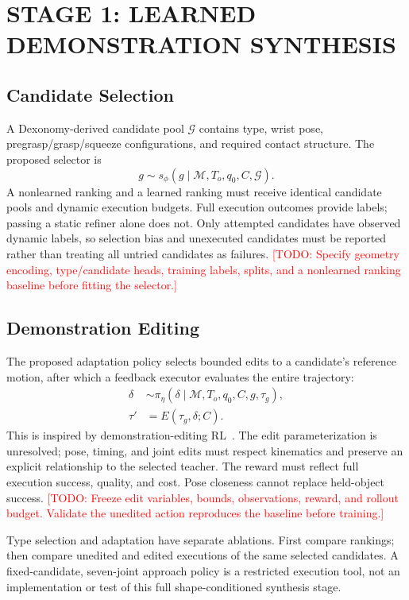 \documentclass[letterpaper, 10 pt, conference]{ieeeconf}
\newcommand{\todo}[1]{\textcolor{red}{[TODO: #1]}}
\begin{document}
\section{STAGE 1: LEARNED DEMONSTRATION SYNTHESIS}
\subsection{Candidate Selection}
A Dexonomy-derived candidate pool $\mathcal{G}$ contains type, wrist pose,
pregrasp/grasp/squeeze configurations, and required contact structure. The
proposed selector is
\begin{equation}
g \sim s_\phi(g\mid\mathcal{M},T_o,q_0,C,\mathcal{G}).
\end{equation}
A nonlearned ranking and a learned ranking must receive identical candidate
pools and dynamic execution budgets. Full execution outcomes provide labels;
passing a static refiner alone does not. Only attempted candidates have
observed dynamic labels, so selection bias and unexecuted candidates must be
reported rather than treating all untried candidates as failures.
\todo{Specify geometry encoding, type/candidate heads, training labels, splits,
and a nonlearned ranking baseline before fitting the selector.}

\subsection{Demonstration Editing}
The proposed adaptation policy selects bounded edits to a candidate's reference
motion, after which a feedback executor evaluates the entire trajectory:
\begin{align}
\delta &\sim \pi_\eta(\delta\mid\mathcal{M},T_o,q_0,C,g,\tau_g),\\
\tau' &= E(\tau_g,\delta;C).
\end{align}
This is inspired by demonstration-editing RL~\cite{demofungrasp}. The edit
parameterization is unresolved; pose, timing, and joint edits must respect
kinematics and preserve an explicit relationship to the selected teacher.
The reward must reflect full execution success, quality, and cost. Pose
closeness cannot replace held-object success.
\todo{Freeze edit variables, bounds, observations, reward, and rollout budget.
Validate the unedited action reproduces the baseline before training.}

Type selection and adaptation have separate ablations. First compare rankings;
then compare unedited and edited executions of the same selected candidates.
A fixed-candidate, seven-joint approach policy is a restricted execution tool,
not an implementation or test of this full shape-conditioned synthesis stage.
\end{document}
